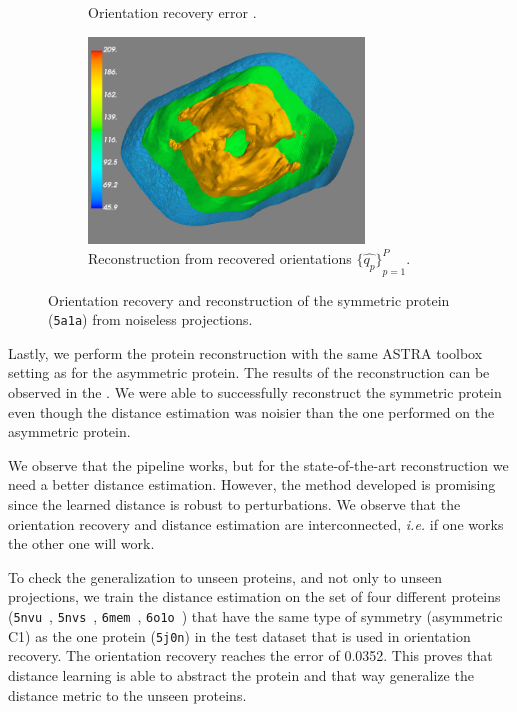 \begin{figure}[ht!]
\begin{subfigure}[b]{0.45\textwidth}
        \caption{Orientation recovery error .}
    \end{subfigure}
    \hfill
    \begin{subfigure}[b]{0.45\textwidth}
        \centering
        \includegraphics[height=5.5cm]{figures/5a1a_aligned}
        \caption{Reconstruction from recovered orientations ${\big\{\widehat{q_p}\big\}}_{p=1}^P$.}
    \end{subfigure}
    \caption{
        Orientation recovery and reconstruction of the symmetric protein (\texttt{5a1a}) from noiseless projections.
    }\label{fig:5a1a-orientation-recovery-loss}
    \label{fig:angle-alignment-5a1a-noise0}
    \label{fig:5a1a-reconstruction-noise0}
\end{figure}

Lastly, we perform the protein reconstruction with the same ASTRA toolbox setting as for the asymmetric protein. The results of the reconstruction can be observed in the .
We were able to successfully reconstruct the symmetric protein even though the distance estimation was noisier than the one performed on the asymmetric protein.

We observe that the pipeline works, but for the state-of-the-art reconstruction we need a better distance estimation.
However, the method developed is promising since the learned distance is robust to perturbations.
We observe that the orientation recovery and distance estimation are interconnected, \textit{i.e.} if one works the other one will work.

To check the generalization to unseen proteins, and not only to  unseen projections, we train the distance estimation on the set of four different proteins (\texttt{5nvu}~\cite{5nvu_pdb}, \texttt{5nvs}~\cite{5nvs_pdb}, \texttt{6mem}~\cite{6mem_pdb}, \texttt{6o1o}~\cite{6o1o_pdb}) that have the same type of symmetry (asymmetric  C1) as the one protein (\texttt{5j0n}) in the test dataset that is used in orientation recovery.
The orientation recovery reaches the error of 0.0352.
This proves that distance learning is able to abstract the protein and that way generalize the distance metric to the unseen proteins.
